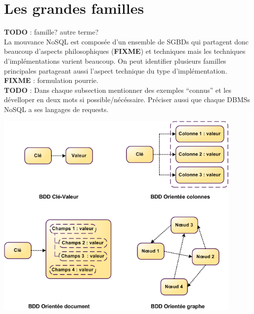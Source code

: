 \documentclass[11pt]{article}
\begin{document}
\section{Les grandes familles}
\colorbox{BrickRed}{\textbf{TODO} : famille? autre terme?} \\
La mouvance NoSQL est composée d'un ensemble de SGBDs qui partagent donc beaucoup d'aspects philosophiques (\colorbox{BrickRed}{\textbf{FIXME}}) et techniques mais les techniques d'implémentations varient beaucoup. On peut identifier plusieurs familles principales partageant aussi l'aspect technique du type d'implémentation. \colorbox{BrickRed}{\textbf{FIXME} : formulation pourrie.} \\
\colorbox{BrickRed}{\textbf{TODO} : Dans chaque subsection mentionner des exemples ``connus'' et les dévelloper en deux mots si} \colorbox{BrickRed}{possible/nécéssaire. Préciser aussi que chaque DBMSs NoSQL a ses langages de requests.}
\begin{center}
  \includegraphics[width=12cm]{nosql.png}
\end{center}
\end{document}
